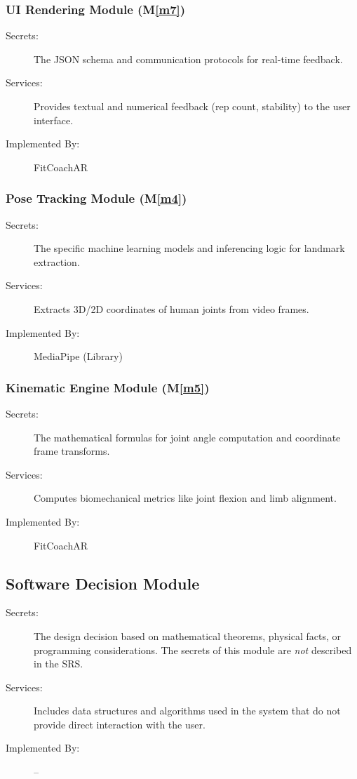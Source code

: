\documentclass[12pt, titlepage]{article}
\newcommand{\mref}[1]{M\ref{#1}}
\begin{document}
\subsubsection{UI Rendering Module (\mref{m7})}
\begin{description}
\item[Secrets:] The JSON schema and communication protocols for real-time feedback.
\item[Services:] Provides textual and numerical feedback (rep count, stability) to the user interface.
\item[Implemented By:] FitCoachAR
\end{description}

\subsubsection{Pose Tracking Module (\mref{m4})}
\begin{description}
\item[Secrets:] The specific machine learning models and inferencing logic for landmark extraction.
\item[Services:] Extracts 3D/2D coordinates of human joints from video frames.
\item[Implemented By:] MediaPipe (Library)
\end{description}

\subsubsection{Kinematic Engine Module (\mref{m5})}
\begin{description}
\item[Secrets:] The mathematical formulas for joint angle computation and coordinate frame transforms.
\item[Services:] Computes biomechanical metrics like joint flexion and limb alignment.
\item[Implemented By:] FitCoachAR
\end{description}

\subsection{Software Decision Module}

\begin{description}
\item[Secrets:] The design decision based on mathematical theorems, physical
  facts, or programming considerations. The secrets of this module are
  \emph{not} described in the SRS.
\item[Services:] Includes data structures and algorithms used in the system that
  do not provide direct interaction with the user.
\item[Implemented By:] --
\end{description}
\end{document}
